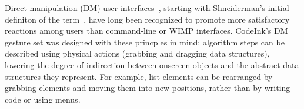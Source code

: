 Direct manipulation (DM) user interfaces~\cite{Hutchins1985}, starting with
Shneiderman's initial definiton of the term~\cite{Shneiderman1982}, have long
been recognized to promote more satisfactory reactions among users than
command-line or WIMP interfaces. CodeInk's DM gesture set was designed with
these princples in mind: algorithm steps can be described using physical actions
(grabbing and dragging data structures), lowering the degree of indirection
between onscreen objects and the abstract data structures they represent. For
example, list elements can be rearranged by grabbing elements and moving them
into new positions, rather than by writing code or using menus.



\begin{comment}
Programming by example~\cite{Lieberman2001} enables the user to write programs by
providing example input-output pairs. A related technique, programming by
demonstration~\cite{Cypher1993}, lets the user demonstrate individual steps
using a direct manipulation UI. Tools that embody these techniques often
generalize the user's actions to synthesize programs that operate on new,
unknown inputs~\cite{Yessenov2013, Kandel2011}.
CodeInk takes inspiration from these tools and allows the user to explain
algorithms by demonstration, rather than by writing code. CodeInk does not yet
provide generalization capabilities; we plan to add that in future work.
\end{comment}
